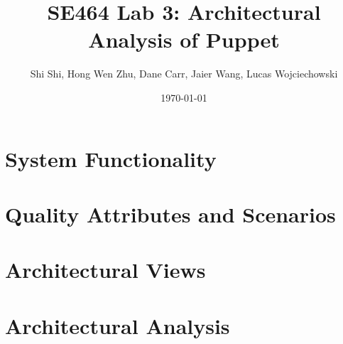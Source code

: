 \documentclass[a4paper]{article}
\title{SE464 Lab 3: Architectural Analysis of Puppet}
\author{Shi Shi, Hong Wen Zhu, Dane Carr, Jaier Wang, Lucas Wojciechowski}
\date{\today}
\begin{document}
\maketitle

\section{System  Functionality} %


\section{Quality Attributes and Scenarios} %


\section{Architectural Views} %



\section{Architectural Analysis} %

\end{document}
